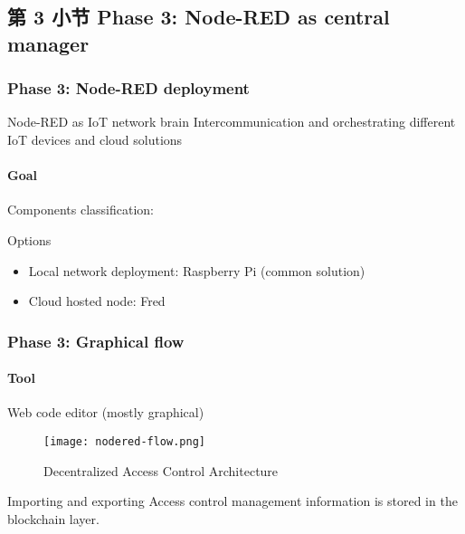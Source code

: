 \documentclass[
    aspectratio=169,                   %
]{beamer}
\begin{document}
\subsection{第 3 小节 Phase 3: Node-RED as central manager}

    \begin{frame}
        \frametitle{Phase 3: Node-RED deployment}

        \begin{block}{Node-RED as IoT network brain}
            Intercommunication and orchestrating different IoT devices and cloud solutions
        \end{block}

        \paragraph{Goal} Components classification:

        \begin{block}{Options}
            \begin{itemize}
                \item \alert{Local network deployment}: Raspberry Pi (common solution)
                \item \alert{Cloud hosted node}: Fred
            \end{itemize}
        \end{block}

    \end{frame}

    \begin{frame}
        \frametitle{Phase 3: Graphical flow}

        \paragraph{Tool} Web code editor (mostly graphical)

        \begin{figure}
            \centering
            \begin{stampbox}
                \texttt{[image: nodered-flow.png]}
            \end{stampbox}
            \caption{Decentralized Access Control Architecture}
        \end{figure}

        \begin{block}{Importing and exporting}
            Access control management information is stored in the blockchain layer.
        \end{block}
        
    \end{frame}
\end{document}
